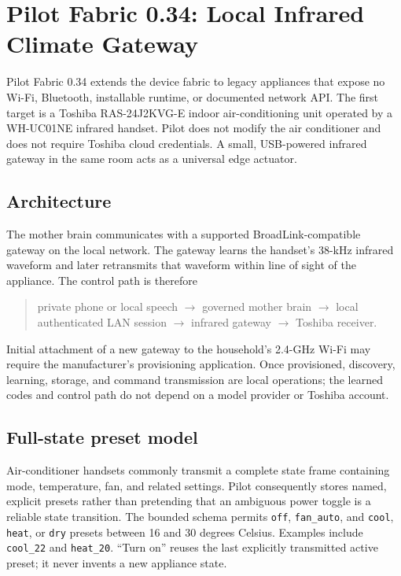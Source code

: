 \section{Pilot Fabric 0.34: Local Infrared Climate Gateway}
\label{sec:local-ir-climate}

Pilot Fabric 0.34 extends the device fabric to legacy appliances that expose no
Wi-Fi, Bluetooth, installable runtime, or documented network API.  The first
target is a Toshiba RAS-24J2KVG-E indoor air-conditioning unit operated by a
WH-UC01NE infrared handset.  Pilot does not modify the air conditioner and does
not require Toshiba cloud credentials.  A small, USB-powered infrared gateway
in the same room acts as a universal edge actuator.

\subsection{Architecture}

The mother brain communicates with a supported BroadLink-compatible gateway on
the local network.  The gateway learns the handset's 38-kHz infrared waveform
and later retransmits that waveform within line of sight of the appliance.  The
control path is therefore
\begin{quote}
private phone or local speech $\rightarrow$ governed mother brain $\rightarrow$
local authenticated LAN session $\rightarrow$ infrared gateway $\rightarrow$
Toshiba receiver.
\end{quote}
Initial attachment of a new gateway to the household's 2.4-GHz Wi-Fi may require
the manufacturer's provisioning application.  Once provisioned, discovery,
learning, storage, and command transmission are local operations; the learned
codes and control path do not depend on a model provider or Toshiba account.

\subsection{Full-state preset model}

Air-conditioner handsets commonly transmit a complete state frame containing
mode, temperature, fan, and related settings.  Pilot consequently stores named,
explicit presets rather than pretending that an ambiguous power toggle is a
reliable state transition.  The bounded schema permits \texttt{off},
\texttt{fan\_auto}, and \texttt{cool}, \texttt{heat}, or \texttt{dry} presets
between 16 and 30 degrees Celsius.  Examples include \texttt{cool\_22} and
\texttt{heat\_20}.  ``Turn on'' reuses the last explicitly transmitted active
preset; it never invents a new appliance state.

